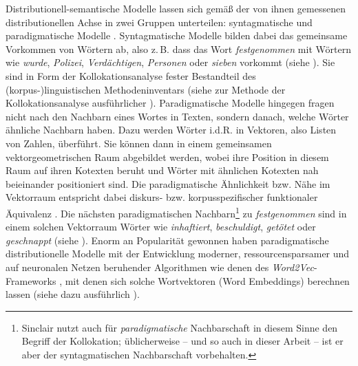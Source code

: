 Distributionell-semantische Modelle lassen sich gemäß der von ihnen gemessenen distributionellen Achse in zwei Gruppen unterteilen: syntagmatische und paradigmatische Modelle \autocite[40]{sahlgrenDistributionalHypothesis2008}. Syntagmatische Modelle bilden dabei das gemeinsame Vorkommen von Wörtern ab, also z.\,B. dass das Wort \emph{festgenommen} mit Wörtern wie \emph{wurde}, \emph{Polizei}, \emph{Verdächtigen}, \emph{Personen} oder \emph{sieben} vorkommt (siehe ). Sie sind in Form der Kollokationsanalyse fester Bestandteil des (korpus\mbox{-})linguistischen Methodeninventars (siehe zur Methode der Kollokationsanalyse ausführlicher ). Paradigmatische Modelle hingegen fragen nicht nach den Nachbarn eines Wortes in Texten, sondern danach, welche Wörter ähnliche Nachbarn haben. Dazu werden Wörter i.d.R. in Vektoren, also Listen von Zahlen, überführt. Sie können dann in einem gemeinsamen vektorgeometrischen Raum abgebildet werden, wobei ihre Position in diesem Raum auf ihren Kotexten beruht und Wörter mit ähnlichen Kotexten nah beieinander positioniert sind. Die paradigmatische Ähnlichkeit bzw. Nähe im Vektorraum entspricht dabei diskurs- bzw. korpusspezifischer funktionaler Äquivalenz \autocite[587]{bubenhoferSemantischeAquivalenzGeburtserzahlungen2020}. Die nächsten paradigmatischen Nachbarn\footnote{Sinclair \autocite*[142]{sinclairTrustTextLanguage2004} nutzt auch für \emph{paradigmatische} Nachbarschaft in diesem Sinne den Begriff der Kollokation; üblicherweise -- und so auch in dieser Arbeit -- ist er aber der syntagmatischen Nachbarschaft vorbehalten.} zu \emph{festgenommen} sind in einem solchen Vektorraum Wörter wie \emph{inhaftiert}, \emph{beschuldigt}, \emph{getötet} oder \emph{geschnappt} (siehe ). Enorm an Popularität gewonnen haben paradigmatische distributionelle Modelle mit der Entwicklung moderner, ressourcensparsamer und auf neuronalen Netzen beruhender Algorithmen wie denen des \emph{Word2Vec}-Frameworks \autocite{mikolovEfficientEstimationWord2013}, mit denen sich solche Wortvektoren (Word Embeddings) berechnen lassen (siehe dazu ausführlich ).


